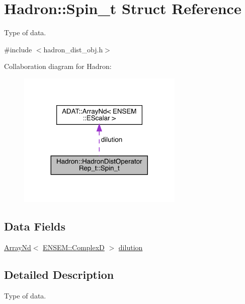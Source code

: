 \hypertarget{structHadron_1_1HadronDistOperatorRep__t_1_1Spin__t}{}\section{Hadron\+:\+:Spin\+\_\+t Struct Reference}
\label{structHadron_1_1HadronDistOperatorRep__t_1_1Spin__t}


Type of data.  




{\ttfamily \#include $<$hadron\+\_\+dist\+\_\+obj.\+h$>$}



Collaboration diagram for Hadron\+:\nopagebreak
\begin{figure}[H]
\begin{center}
\leavevmode
\includegraphics[width=224pt]{d3/d36/structHadron_1_1HadronDistOperatorRep__t_1_1Spin__t__coll__graph}
\end{center}
\end{figure}
\subsection*{Data Fields}
\begin{DoxyCompactItemize}
\item 
\mbox{\hyperlink{classADAT_1_1ArrayNd}{Array\+Nd}}$<$ \mbox{\hyperlink{group__defs_gaf38ee8c84f090ee0c3b76e7a384fb316}{E\+N\+S\+E\+M\+::\+ComplexD}} $>$ \mbox{\hyperlink{structHadron_1_1HadronDistOperatorRep__t_1_1Spin__t_a848b37978200587c937b56cc52234b1c}{dilution}}
\end{DoxyCompactItemize}


\subsection{Detailed Description}
Type of data. 

